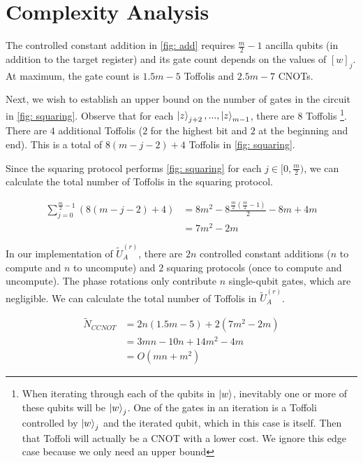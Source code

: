 \section{Complexity Analysis}

The controlled constant addition in \ref{fig: add} requires $\frac{m}{2} - 1$ ancilla qubits (in addition to the target register) and its gate count depends on the values of $[w]_j$. At maximum, the gate count is $1.5m - 5$ Toffolis and $2.5m - 7$ CNOTs.

Next, we wish to establish an upper bound on the number of gates in the circuit in \ref{fig: squaring}. Observe that for each $\ket{z}_{j + 2}, ..., \ket{z}_{m - 1}$, there are $8$ Toffolis \footnote{When iterating through each of the qubits in $\ket{w}$, inevitably one or more of these qubits will be $\ket{w}_j$. One of the gates in an iteration is a Toffoli controlled by $\ket{w}_j$ and the iterated qubit, which in this case is itself. Then that Toffoli will actually be a CNOT with a lower cost. We ignore this edge case because we only need an upper bound}. There are $4$ additional Toffolis ($2$ for the highest bit and $2$ at the beginning and end). This is a total of $8(m - j - 2) + 4$ Toffolis in \ref{fig: squaring}.

Since the squaring protocol performs \ref{fig: squaring} for each $j \in [0, \frac{m}{2})$, we can calculate the total number of Toffolis in the squaring protocol.

\begin{equation}
    \begin{split}
        \sum_{j = 0}^{\frac{m}{2} - 1} (8(m - j - 2) + 4) &= 8m^2 - 8\frac{\frac{m}{2}(\frac{m}{2} - 1)}{2} - 8m + 4m \\
        &= 7m^2 - 2m
    \end{split}
\end{equation}

In our implementation of $\tilde{U}_A^{(r)}$, there are $2n$ controlled constant additions ($n$ to compute and $n$ to uncompute) and $2$ squaring protocols (once to compute and uncompute). The phase rotations only contribute $n$ single-qubit gates, which are negligible. We can calculate the total number of Toffolis in $\tilde{U}_A^{(r)}$.

\begin{equation}
    \begin{split}
        \tilde{N}_{CCNOT} &= 2n(1.5m - 5) + 2(7m^2 - 2m) \\
        &= 3mn - 10n + 14m^2 - 4m \\
        &= O(mn + m^2) \label{eq: toffolis}
    \end{split}
\end{equation}

